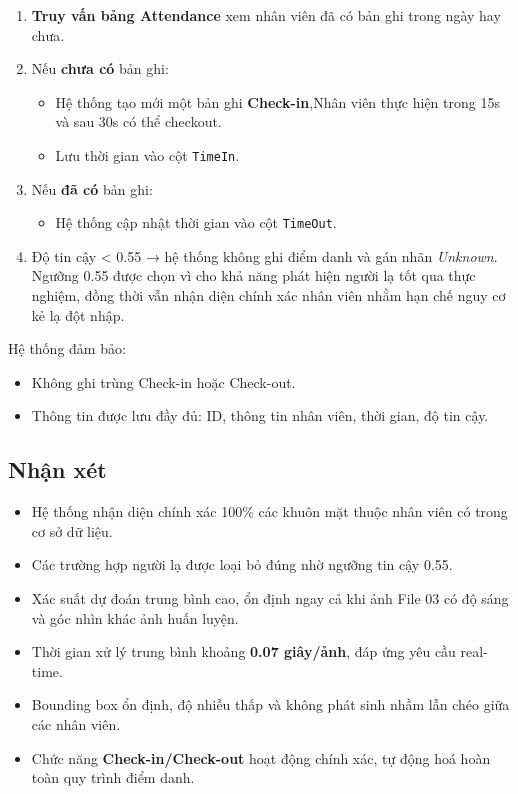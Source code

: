 \documentclass[a4paper]{book}
\begin{document}
\begin{enumerate}
    \item \textbf{Truy vấn bảng Attendance} xem nhân viên đã có bản ghi trong ngày hay chưa.
    \item Nếu \textbf{chưa có} bản ghi:
    \begin{itemize}
        \item Hệ thống tạo mới một bản ghi \textbf{Check-in},Nhân viên thực hiện trong 15s và sau 30s có thể checkout.
        \item Lưu thời gian vào cột \texttt{TimeIn}.
    \end{itemize}
    \item Nếu \textbf{đã có} bản ghi:
    \begin{itemize}
        \item Hệ thống cập nhật thời gian vào cột \texttt{TimeOut}.
    \end{itemize}
    \item Độ tin cậy < 0.55 → hệ thống không ghi điểm danh và gán nhãn \textit{Unknown}. Ngưỡng 0.55 được chọn vì cho khả năng phát hiện người lạ tốt qua thực nghiệm, đồng thời vẫn nhận diện chính xác nhân viên nhằm hạn chế nguy cơ kẻ lạ đột nhập.

\end{enumerate}

Hệ thống đảm bảo:
\begin{itemize}
    \item Không ghi trùng Check-in hoặc Check-out.  
    \item Thông tin được lưu đầy đủ: ID, thông tin nhân viên, thời gian, độ tin cậy.  
\end{itemize}

\subsection*{Nhận xét}
\begin{itemize}
    \item Hệ thống nhận diện chính xác 100\% các khuôn mặt thuộc nhân viên có trong cơ sở dữ liệu.
    \item Các trường hợp người lạ được loại bỏ đúng nhờ ngưỡng tin cậy 0.55.
    \item Xác suất dự đoán trung bình cao, ổn định ngay cả khi ảnh File 03 có độ sáng và góc nhìn khác ảnh huấn luyện.
    \item Thời gian xử lý trung bình khoảng \textbf{0.07 giây/ảnh}, đáp ứng yêu cầu real-time.
    \item Bounding box ổn định, độ nhiễu thấp và không phát sinh nhầm lẫn chéo giữa các nhân viên.
    \item Chức năng \textbf{Check-in/Check-out} hoạt động chính xác, tự động hoá hoàn toàn quy trình điểm danh.
\end{itemize}
\end{document}
